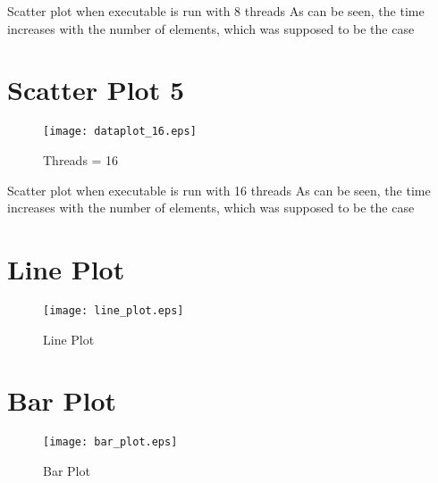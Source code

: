 \documentclass{article}
\begin{document}
Scatter plot when executable is run with 8 threads
\newline
As can be seen, the time increases with the number of elements, which was supposed to be the case
\newline
\section*{Scatter Plot 5}

\begin{figure}[H]
  \centering
  \texttt{[image: dataplot\_16.eps]}
  \caption{Threads = 16}
\end{figure}

Scatter plot when executable is run with 16 threads
\newline
As can be seen, the time increases with the number of elements, which was supposed to be the case
\newline

\section*{Line Plot}

\begin{figure}[H]
  \centering
  \texttt{[image: line\_plot.eps]}
  \caption{Line Plot}
\end{figure}

\section*{Bar Plot}

\begin{figure}[H]
  \centering
  \texttt{[image: bar\_plot.eps]}
  \caption{Bar Plot}
\end{figure}
\end{document}
